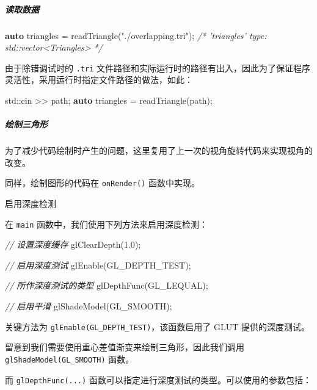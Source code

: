 \documentclass[
]{article}
\newenvironment{Shaded}{}{}
\newcommand{\BuiltInTok}[1]{#1}
\newcommand{\CommentTok}[1]{\textcolor[rgb]{0.38,0.63,0.69}{\textit{#1}}}
\newcommand{\FloatTok}[1]{\textcolor[rgb]{0.25,0.63,0.44}{#1}}
\newcommand{\KeywordTok}[1]{\textcolor[rgb]{0.00,0.44,0.13}{\textbf{#1}}}
\newcommand{\NormalTok}[1]{#1}
\newcommand{\StringTok}[1]{\textcolor[rgb]{0.25,0.44,0.63}{#1}}
\begin{document}
\hypertarget{header-n38}{%
\subparagraph{读取数据}\label{header-n38}}

\begin{Shaded}
\begin{Highlighting}[]
\KeywordTok{auto}\NormalTok{ triangles = readTriangle(}\StringTok{"./overlapping.tri"}\NormalTok{);}
\CommentTok{/* 'triangles' type: std::vector<Triangles> */}
\end{Highlighting}
\end{Shaded}

由于除错调试时的 \texttt{.tri}
文件路径和实际运行时的路径有出入，因此为了保证程序灵活性，采用运行时指定文件路径的做法，如此：

\begin{Shaded}
\begin{Highlighting}[]
\BuiltInTok{std::}\NormalTok{cin >> path;}
\KeywordTok{auto}\NormalTok{ triangles = readTriangle(path);}
\end{Highlighting}
\end{Shaded}

\hypertarget{header-n42}{%
\subparagraph{绘制三角形}\label{header-n42}}

为了减少代码绘制时产生的问题，这里复用了上一次的视角旋转代码来实现视角的改变。

同样，绘制图形的代码在 \texttt{onRender()} 函数中实现。

启用深度检测

在 \texttt{main} 函数中，我们使用下列方法来启用深度检测：

\begin{Shaded}
\begin{Highlighting}[]
\CommentTok{// 设置深度缓存}
\NormalTok{glClearDepth(}\FloatTok{1.0}\NormalTok{);}

\CommentTok{// 启用深度测试}
\NormalTok{glEnable(GL_DEPTH_TEST);}

\CommentTok{// 所作深度测试的类型}
\NormalTok{glDepthFunc(GL_LEQUAL);}

\CommentTok{// 启用平滑}
\NormalTok{glShadeModel(GL_SMOOTH);}
\end{Highlighting}
\end{Shaded}

关键方法为 \texttt{glEnable(GL\_DEPTH\_TEST)}，该函数启用了 GLUT
提供的深度测试。

留意到我们需要使用重心差值渐变来绘制三角形，因此我们调用
\texttt{glShadeModel(GL\_SMOOTH)} 函数。

而 \texttt{glDepthFunc(...)}
函数可以指定进行深度测试的类型。可以使用的参数包括：
\end{document}
